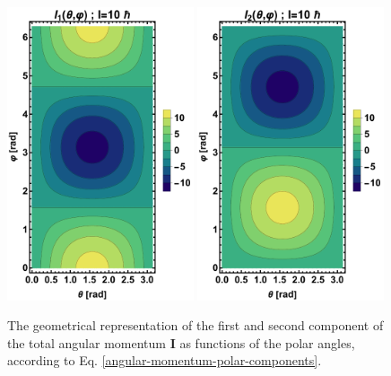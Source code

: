 \begin{figure}
    \centering
    \includegraphics[width=0.49\textwidth]{Chapters/Figures/angular_components-TRM-1.pdf}
    \includegraphics[width=0.49\textwidth]{Chapters/Figures/angular_components-TRM-2.pdf}
    \caption{The geometrical representation of the first and second component of the total angular momentum $\mathbf{I}$ as functions of the polar angles, according to Eq. \ref{angular-momentum-polar-components}.}
    \label{figs-angular-momentum-components-polar}
\end{figure}

